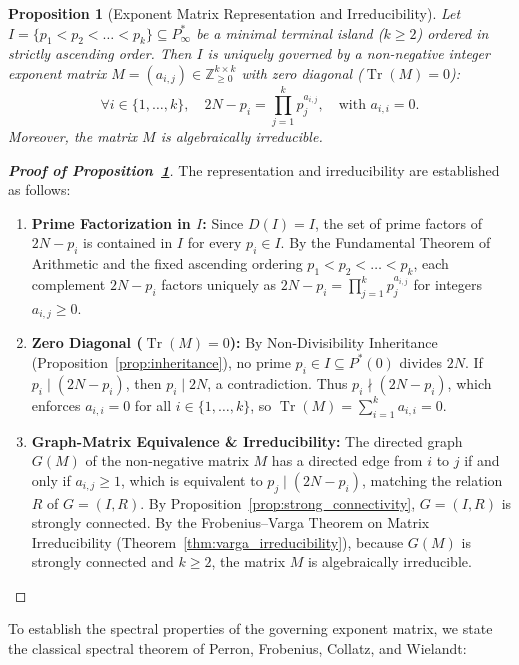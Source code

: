 \documentclass[11pt,a4paper]{article}
\newtheorem{proposition}[theorem]{Proposition}
\theoremstyle{definition}
\begin{document}
\begin{proposition}[Exponent Matrix Representation and Irreducibility]
\label{prop:matrix_rep}
Let $I = \{p_1 < p_2 < \dots < p_k\} \subseteq P^*_\infty$ be a minimal terminal island ($k \ge 2$) ordered in strictly ascending order. Then $I$ is uniquely governed by a non-negative integer exponent matrix $M = (a_{i,j}) \in \mathbb{Z}_{\ge 0}^{k \times k}$ with zero diagonal ($\operatorname{Tr}(M) = 0$):
\[
\forall i \in \{1, \dots, k\}, \quad 2N - p_i = \prod_{j=1}^k p_j^{a_{i,j}}, \quad \text{with } a_{i,i} = 0.
\]
Moreover, the matrix $M$ is algebraically irreducible.
\end{proposition}
\begin{proof}[\textbf{Proof of Proposition~\ref{prop:matrix_rep}}]
The representation and irreducibility are established as follows:
\begin{enumerate}
    \item \textbf{Prime Factorization in $I$:} Since $D(I) = I$, the set of prime factors of $2N - p_i$ is contained in $I$ for every $p_i \in I$. By the Fundamental Theorem of Arithmetic and the fixed ascending ordering $p_1 < p_2 < \dots < p_k$, each complement $2N - p_i$ factors uniquely as $2N - p_i = \prod_{j=1}^k p_j^{a_{i,j}}$ for integers $a_{i,j} \ge 0$.
    \item \textbf{Zero Diagonal ($\operatorname{Tr}(M) = 0$):} By Non-Divisibility Inheritance (Proposition~\ref{prop:inheritance}), no prime $p_i \in I \subseteq P^*(0)$ divides $2N$. If $p_i \mid (2N - p_i)$, then $p_i \mid 2N$, a contradiction. Thus $p_i \nmid (2N - p_i)$, which enforces $a_{i,i} = 0$ for all $i \in \{1, \dots, k\}$, so $\operatorname{Tr}(M) = \sum_{i=1}^k a_{i,i} = 0$.
    \item \textbf{Graph-Matrix Equivalence \& Irreducibility:} The directed graph $G(M)$ of the non-negative matrix $M$ has a directed edge from $i$ to $j$ if and only if $a_{i,j} \ge 1$, which is equivalent to $p_j \mid (2N - p_i)$, matching the relation $R$ of $G = (I, R)$. By Proposition~\ref{prop:strong_connectivity}, $G = (I, R)$ is strongly connected. By the Frobenius--Varga Theorem on Matrix Irreducibility (Theorem~\ref{thm:varga_irreducibility}), because $G(M)$ is strongly connected and $k \ge 2$, the matrix $M$ is algebraically irreducible.
\end{enumerate}
\end{proof}

To establish the spectral properties of the governing exponent matrix, we state the classical spectral theorem of Perron, Frobenius, Collatz, and Wielandt:
\end{document}
